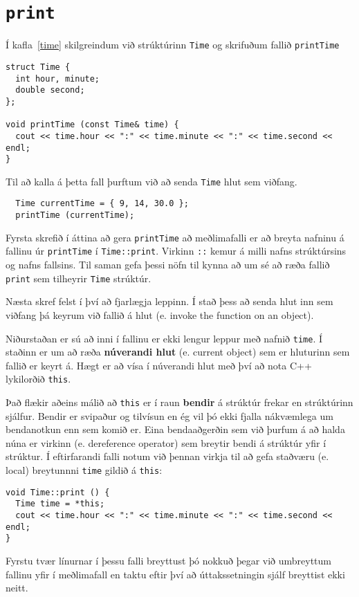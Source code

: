 \section{{\tt print}}

Í kafla~\ref{time} skilgreindum við strúktúrinn {\tt Time}
og skrifuðum fallið {\tt printTime}

\begin{verbatim}
struct Time {
  int hour, minute;
  double second;
};

void printTime (const Time& time) {
  cout << time.hour << ":" << time.minute << ":" << time.second << endl;
}
\end{verbatim}
%
Til að kalla á þetta fall þurftum við að senda {\tt Time} hlut sem viðfang. 

\begin{verbatim}
  Time currentTime = { 9, 14, 30.0 };
  printTime (currentTime);
\end{verbatim}
%
Fyrsta skrefið í áttina að gera {\tt printTime} að meðlimafalli er að breyta nafninu á fallinu úr {\tt printTime} í {\tt Time::print}.
Virkinn {\tt ::} kemur á milli nafns strúktúrsins og nafns fallsins.
Til saman gefa þessi nöfn til kynna að um sé að ræða fallið {\tt print} sem tilheyrir {\tt Time} strúktúr.

Næsta skref felst í því að fjarlægja leppinn.
Í stað þess að senda hlut inn sem viðfang þá keyrum við fallið á hlut (e. invoke the function on an object).

Niðurstaðan er sú að inni í fallinu er ekki lengur leppur með nafnið {\tt time}.
Í staðinn er um að ræða {\bf núverandi hlut} (e. current object) sem er hluturinn sem fallið er keyrt á.
Hægt er að vísa í núverandi hlut með því að nota C++ lykilorðið {\tt this}.


Það flækir aðeins málið að {\tt this} er í raun {\bf bendir} á strúktúr frekar en strúktúrinn sjálfur.
Bendir er svipaður og tilvísun en ég vil þó ekki fjalla nákvæmlega um bendanotkun enn sem komið er.
Eina bendaaðgerðin sem við þurfum á að halda núna er {\tt *} virkinn (e. dereference operator) sem breytir bendi á strúktúr yfir í strúktur.
Í eftirfarandi falli notum við þennan virkja til að gefa staðværu (e. local) breytunnni {\tt time} gildið á {\tt this}:

\begin{verbatim}
void Time::print () {
  Time time = *this;
  cout << time.hour << ":" << time.minute << ":" << time.second << endl;
}
\end{verbatim}
%
Fyrstu tvær línurnar í þessu falli breyttust þó nokkuð þegar við umbreyttum fallinu yfir í meðlimafall 
en taktu eftir því að úttakssetningin sjálf breyttist ekki neitt.

